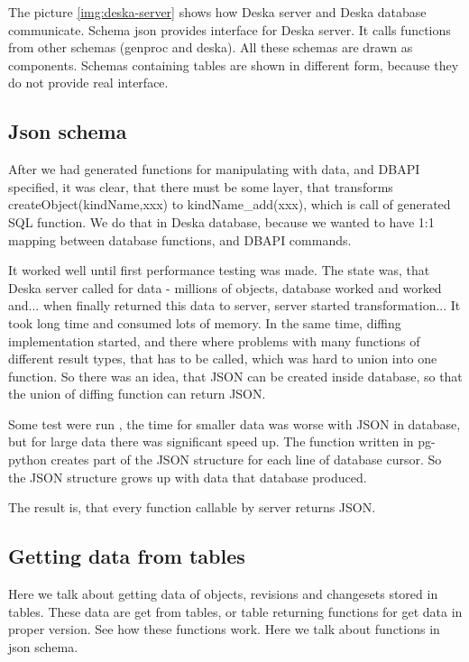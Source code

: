 \documentclass[deska]{subfiles}
\begin{document}
The picture \ref{img:deska-server} shows how Deska server and Deska database communicate. Schema json provides interface for Deska server. It
calls functions from other schemas (genproc and deska). All these schemas are drawn as components. Schemas containing
tables are shown in different form, because they do not provide real interface.

\subsection{Json schema}
\label{sec:schema-json}
After we had generated functions for manipulating with data, and DBAPI specified, it was clear, that there must be some layer,
that transforms createObject(kindName,xxx) to kindName\_add(xxx), which is call of generated SQL function.
We do that in Deska database, because we wanted to have 1:1 mapping between database functions, and DBAPI commands.

It worked well until first performance testing was made. The state was, that Deska server called for data - millions of objects,
database worked and worked and... when finally returned this data to server, server started transformation... It took long time
and consumed lots of memory.
In the same time, diffing implementation started, and there where problems with many functions of different result types,
that has to be called, which was hard to union into one function.
So there was an idea, that JSON can be created inside database, so that the union of diffing function can return JSON.

Some test were run , the time for smaller data was worse with JSON in database, but for large data there was significant
speed up. The function written in pg-python creates part of the JSON structure for each line of database cursor.
So the JSON structure grows up with data that database produced.

The result is, that every function callable by server returns JSON.

\subsection{Getting data from tables}
\label{sec:data-functions}
Here we talk about getting data of objects, revisions and changesets stored in tables.
These data are get from tables, or table returning functions for get data in proper version.
See  how these functions work. Here we talk about functions in json schema.
\end{document}
